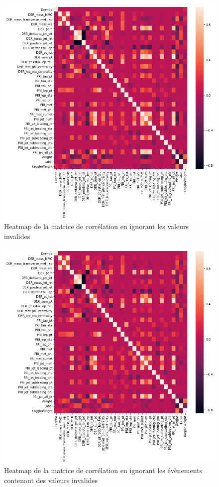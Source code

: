 \documentclass[12pt]{article}
\begin{document}
\begin{figure}[H]
    \center 
    \includegraphics[width=\textwidth]{images/heatmap.png}
    \caption{Heatmap de la matrice de corrélation en ignorant les valeurs
    invalides}
    \label{img:heatmap}
\end{figure}

\begin{figure}[H]
    \center 
    \includegraphics[width=\textwidth]{images/heatmap_restricted.png}
    \caption{Heatmap de la matrice de corrélation en ignorant les évènements
    contenant des valeurs invalides}
    \label{img:heatmap-restricted}
\end{figure}
\end{document}
